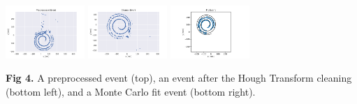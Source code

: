 \documentclass[ansiepaper,portrait]{baposter}
\begin{document}
\begin{poster}
{{\begin{center}
\includegraphics [width=30mm] {preprocess_evt.pdf}
\hspace{3cm}
\includegraphics [width=30mm] {clean_evt.pdf}
\hspace{0cm}
\includegraphics [width=30mm] {fit_evt.pdf}
\end{center}
\textbf{Fig 4.} A preprocessed event (top), an event after the Hough Transform cleaning (bottom left), and a Monte Carlo fit event (bottom right).}
} 


\end{poster}
\end{document}
